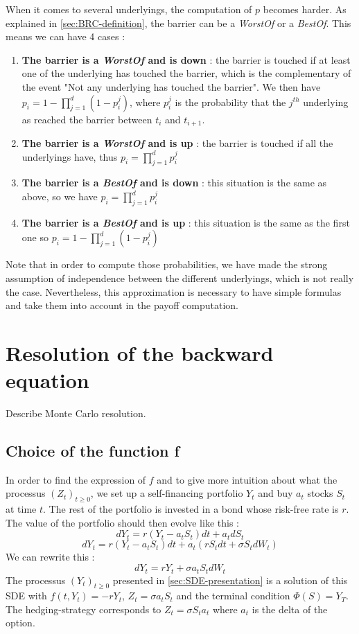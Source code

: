 \documentclass[a4paper,11pt,english]{book}
\begin{document}
When it comes to several underlyings, the computation of $p$ becomes harder. As explained in \ref{sec:BRC-definition}, the barrier can be a \textit{WorstOf} or a \textit{BestOf}. This means we can have 4 cases :
\begin{enumerate}
    \item \textbf{The barrier is a \textit{WorstOf} and is down} : the barrier is touched if at least one of the underlying has touched the barrier, which is the complementary of the event "Not any underlying has touched the barrier". We then have $p_{i}=1-\prod_{j=1}^{d}(1-p_{i}^{j})$, where $p_{i}^{j}$ is the probability that the $j^{th}$ underlying as reached the barrier between $t_{i}$ and $t_{i+1}$.
    
    \item \textbf{The barrier is a \textit{WorstOf} and is up} : the barrier is touched if all the underlyings have, thus $p_{i}=\prod_{j=1}^{d}p_{i}^{j}$
    
    \item \textbf{The barrier is a \textit{BestOf} and is down} : this situation is the same as above, so we have $p_{i}=\prod_{j=1}^{d}p_{i}^{j}$
    
    \item \textbf{The barrier is a \textit{BestOf} and is up} : this situation is the same as the first one so  $p_{i}=1-\prod_{j=1}^{d}(1-p_{i}^{j})$
\end{enumerate}
Note that in order to compute those probabilities, we have made the strong assumption of independence between the different underlyings, which is not really the case. Nevertheless, this approximation is necessary to have simple formulas and take them into account in the payoff computation.
\section{Resolution of the backward equation}
Describe Monte Carlo resolution.
\subsection{Choice of the function f}
\label{subsec:choice-of-f}
In order to find the expression of $f$ and to give more intuition about what the processus $(Z_{t})_{t\geq0}$, we set up a self-financing portfolio $Y_{t}$ and buy $a_{t}$ stocks $S_{t}$ at time $t$. The rest of the portfolio is invested in a bond whose risk-free rate is $r$. The value of the portfolio should then evolve like this :
$$dY_{t} = r(Y_{t}-a_{t}S_{t})dt + a_{t}dS_{t}$$
$$dY_{t} = r(Y_{t}-a_{t}S_{t})dt + a_{t}(rS_{t}dt+\sigma S_{t}dW_{t})$$
We can rewrite this :
$$dY_{t} = rY_{t} + \sigma a_{t}S_{t}dW_{t}$$
The processus $(Y_{t})_{t\geq0}$ presented in \ref{sec:SDE-presentation} is a solution of this SDE with $f(t,Y_{t})=-rY_{t}$, $Z_{t} = \sigma a_{t}S_{t}$ and the terminal condition $\Phi(S)=Y_{T}$.
The hedging-strategy corresponds to $Z_{t}=\sigma S_{t} a_{t}$ where $a_{t}$ is the delta of the option. 
\end{document}
